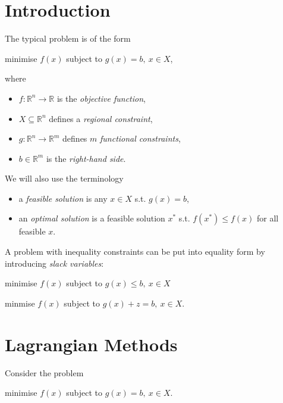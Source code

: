 \documentclass[a4paper]{article}
\begin{document}


\tableofcontents

\section{Introduction}

The typical problem is of the form

\begin{center}
  minimise $f(x)$ subject to $g(x) = b,\: x \in X$,
\end{center}

where

\begin{itemize}
\item $f : \mathbb{R}^n → \mathbb{R}$ is the \emph{objective function},
\item $X \subseteq \mathbb{R}^n$ defines a \emph{regional constraint},
\item $g: \mathbb{R}^n → \mathbb{R}^m$ defines $m$ \emph{functional constraints},
\item $b \in \mathbb{R}^m$ is the \emph{right-hand side}.
\end{itemize}

We will also use the terminology

\begin{itemize}
\item a \emph{feasible solution} is any $x \in X$ s.t. $g(x) = b$,
\item an \emph{optimal solution} is a feasible solution $x^*$ s.t. $f(x^*) ≤ f(x)$ for all feasible $x$.

\end{itemize}

A problem with inequality constraints can be put into equality form by introducing \emph{slack variables}:

\begin{center}
  minimise $f(x)$ subject to $g(x) ≤ b,\: x \in X$

  minmise $f(x)$ subject to $g(x) + z = b,\: x \in X$.
\end{center}

\section{Lagrangian Methods}

Consider the problem

\begin{center}
  minimise $f(x)$ subject to $g(x) = b,\: x \in X$.
\end{center}
\end{document}
